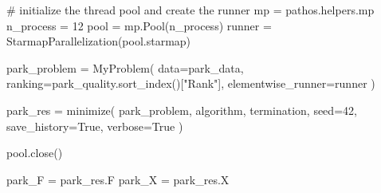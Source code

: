 \documentclass[
  letterpaper,
  DIV=11,
  numbers=noendperiod]{scrartcl}
\newenvironment{Shaded}{\begin{snugshade}}{\end{snugshade}}
\newcommand{\CommentTok}[1]{\textcolor[rgb]{0.37,0.37,0.37}{#1}}
\newcommand{\DecValTok}[1]{\textcolor[rgb]{0.68,0.00,0.00}{#1}}
\newcommand{\NormalTok}[1]{\textcolor[rgb]{0.00,0.23,0.31}{#1}}
\newcommand{\OperatorTok}[1]{\textcolor[rgb]{0.37,0.37,0.37}{#1}}
\newcommand{\StringTok}[1]{\textcolor[rgb]{0.13,0.47,0.30}{#1}}
\newcommand{\VariableTok}[1]{\textcolor[rgb]{0.07,0.07,0.07}{#1}}
\begin{document}
\begin{Shaded}
\begin{Highlighting}[]
\CommentTok{\# initialize the thread pool and create the runner}
\NormalTok{mp }\OperatorTok{=}\NormalTok{ pathos.helpers.mp}
\NormalTok{n\_process }\OperatorTok{=} \DecValTok{12}
\NormalTok{pool }\OperatorTok{=}\NormalTok{ mp.Pool(n\_process)}
\NormalTok{runner }\OperatorTok{=}\NormalTok{ StarmapParallelization(pool.starmap)}

\NormalTok{park\_problem }\OperatorTok{=}\NormalTok{ MyProblem(}
\NormalTok{    data}\OperatorTok{=}\NormalTok{park\_data, ranking}\OperatorTok{=}\NormalTok{park\_quality.sort\_index()[}\StringTok{"Rank"}\NormalTok{], elementwise\_runner}\OperatorTok{=}\NormalTok{runner}
\NormalTok{)}

\NormalTok{park\_res }\OperatorTok{=}\NormalTok{ minimize(}
\NormalTok{    park\_problem, algorithm, termination, seed}\OperatorTok{=}\DecValTok{42}\NormalTok{, save\_history}\OperatorTok{=}\VariableTok{True}\NormalTok{, verbose}\OperatorTok{=}\VariableTok{True}
\NormalTok{)}

\NormalTok{pool.close()}

\NormalTok{park\_F }\OperatorTok{=}\NormalTok{ park\_res.F}
\NormalTok{park\_X }\OperatorTok{=}\NormalTok{ park\_res.X}
\end{Highlighting}
\end{Shaded}
\end{document}
